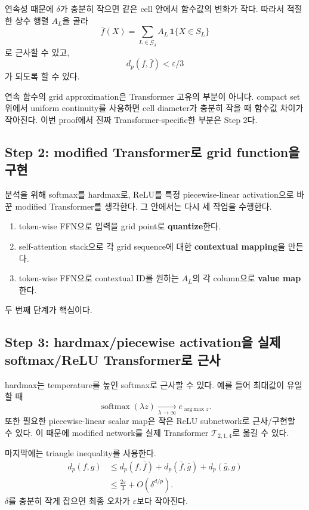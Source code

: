\documentclass[11pt,a4paper,oneside,openany]{memoir}
\newcommand{\softmax}{\operatorname{softmax}}
\DeclareMathOperator*{\argmax}{arg\,max}
\theoremstyle{definition}
\begin{document}
연속성 때문에 $\delta$가 충분히 작으면 같은 cell 안에서 함수값의 변화가 작다.
따라서 적절한 상수 행렬 $A_L$을 골라
\[
\bar f(X)
=
\sum_{L\in\mathcal G_\delta}
A_L\,\mathbf 1\{X\in S_L\}
\]
로 근사할 수 있고,
\[
d_p(f,\bar f)<\varepsilon/3
\]
가 되도록 할 수 있다.

\begin{suppbox}
연속 함수의 grid approximation은 Transformer 고유의 부분이 아니다.
compact set 위에서 uniform continuity를 사용하면 cell diameter가 충분히 작을 때 함수값 차이가 작아진다.
이번 proof에서 진짜 Transformer-specific한 부분은 Step 2다.
\end{suppbox}

\subsection{Step 2: modified Transformer로 grid function을 구현}

분석을 위해 softmax를 hardmax로, ReLU를 특정 piecewise-linear activation으로 바꾼 modified Transformer를 생각한다.
그 안에서는 다시 세 작업을 수행한다.

\begin{enumerate}
  \item token-wise FFN으로 입력을 grid point로 \textbf{quantize}한다.
  \item self-attention stack으로 각 grid sequence에 대한 \textbf{contextual mapping}을 만든다.
  \item token-wise FFN으로 contextual ID를 원하는 $A_L$의 각 column으로 \textbf{value map}한다.
\end{enumerate}

두 번째 단계가 핵심이다.

\subsection{Step 3: hardmax/piecewise activation을 실제 softmax/ReLU Transformer로 근사}

hardmax는 temperature를 높인 softmax로 근사할 수 있다. 예를 들어 최대값이 유일할 때
\[
\softmax(\lambda z)
\xrightarrow[\lambda\to\infty]{}
e_{\argmax z}.
\]
또한 필요한 piecewise-linear scalar map은 작은 ReLU subnetwork로 근사/구현할 수 있다.
이 때문에 modified network를 실제 Transformer $\mathcal T_{2,1,4}$로 옮길 수 있다.

마지막에는 triangle inequality를 사용한다.
\begin{align*}
d_p(f,g)
&\le d_p(f,\bar f)
+d_p(\bar f,\bar g)
+d_p(\bar g,g)\\
&\le \frac{2\varepsilon}{3}+O(\delta^{d/p}).
\end{align*}
$\delta$를 충분히 작게 잡으면 최종 오차가 $\varepsilon$보다 작아진다.
\end{document}
